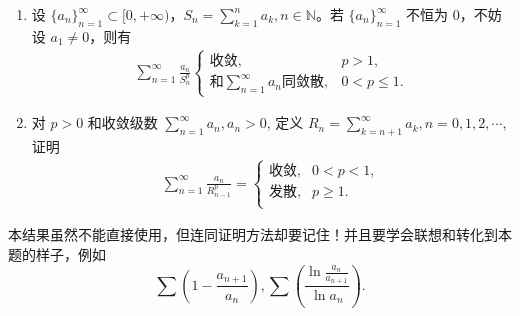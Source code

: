 \documentclass[../../main.tex]{subfiles}%
\begin{document}
\begin{proposition}\label{proposition:部分和相关级数重要性质}
\begin{enumerate}
\item 设 \( \{a_n\}_{n = 1}^{\infty} \subset [0, +\infty) \)，\( S_n = \sum_{k = 1}^{n} a_k, n \in \mathbb{N} \)。若 \( \{a_n\}_{n = 1}^{\infty} \) 不恒为 0，不妨设 \( a_1 \neq 0 \)，则有
\begin{align*}
\sum_{n = 1}^{\infty} \frac{a_n}{S_n^p}
\begin{cases} 
\text{收敛}, & p > 1, \\
\text{和} \sum_{n = 1}^{\infty} a_n \text{同敛散}, & 0 < p \leqslant 1 .
\end{cases}
\end{align*}

\item 对 \( p > 0 \) 和收敛级数 \( \sum_{n=1}^{\infty} a_n, a_n > 0 \), 定义 \( R_n = \sum_{k=n+1}^{\infty} a_k, n = 0,1,2,\cdots \),证明
\begin{align*}
\sum_{n=1}^{\infty}{\frac{a_n}{R_{n-1}^{p}}}=\begin{cases}
\text{收敛},&0<p<1,\\
\text{发散},&p\geqslant 1.\\
\end{cases}
\end{align*}
\end{enumerate}
\end{proposition}
\begin{note}
本结果虽然不能直接使用，但连同证明方法却要记住！并且要学会联想和转化到本题的样子，例如
\[
\sum \left( 1 - \frac{a_{n + 1}}{a_n} \right), \sum \left( \frac{\ln \frac{a_n}{a_{n + 1}}}{\ln a_n} \right).
\]
\end{note}
\end{document}
